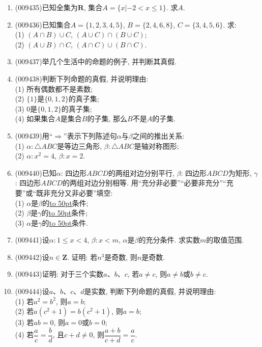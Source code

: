 \documentclass[10pt,a4paper]{article}
\newcommand{\blank}[1]{\underline{\hbox to #1pt{}}}
\begin{document}
\begin{enumerate}[1.]
\item {\tiny (009435)}已知全集为$\mathbf{R}$, 集合$A=\{x|-2<x\le 1\}$. 求$A$.
\item {\tiny (009436)}已知集合$A=\{1, 2, 3, 4, 5\}$, $B=\{2, 4, 6, 8\}$, $C=\{3, 4, 5, 6\}$. 求:\\
(1) $(A\cap B)\cup C$, $(A\cup C)\cap (B\cup C)$;\\
(2) $(A\cup B)\cap C$, $(A\cap C)\cup (B\cap C)$.
\item {\tiny (009437)}举几个生活中的命题的例子, 并判断其真假.
\item {\tiny (009438)}判断下列命题的真假, 并说明理由:\\
(1) 所有偶数都不是素数;\\
(2) $\{1\}$是$\{0, 1, 2\}$的真子集;\\
(3) $0$是$\{0, 1, 2\}$的真子集;\\
(4) 如果集合$A$是集合$B$的子集, 那么$B$不是$A$的子集.
\item {\tiny (009439)}用``$\Rightarrow$''表示下列陈述句$\alpha$与$\beta$之间的推出关系:\\
(1) $\alpha: \triangle ABC$是等边三角形, $\beta: \triangle ABC$是轴对称图形;\\
(2) $\alpha: x^2=4$, $\beta: x=2$.
\item {\tiny (009440)}已知$\alpha$: 四边形$ABCD$的两组对边分别平行, $\beta$: 四边形$ABCD$为矩形, $\gamma$: 四边形$ABCD$的两组对边分别相等. 用``充分非必要''``必要非充分''``充要''或``既非充分又非必要''填空:\\
(1) $\alpha$是$\beta$的\blank{50}条件;\\
(2) $\beta$是$\gamma$的\blank{50}条件;\\
(3) $\alpha$是$\gamma$的\blank{50}条件.
\item {\tiny (009441)}设$\alpha: 1\le x<4$, $\beta: x<m$, $\alpha$是$\beta$的充分条件. 求实数$m$的取值范围.
\item {\tiny (009442)}设$n\in \mathbf{Z}$. 证明: 若$n^3$是奇数, 则$n$是奇数.
\item {\tiny (009443)}证明: 对于三个实数$a$、$b$、$c$, 若$a\ne c$, 则$a\ne b$或$b\ne c$.
\item {\tiny (009444)}设$a$、$b$、$c$、$d$是实数, 判断下列命题的真假, 并说明理由:\\
(1) 若$a^2=b^2$, 则$a=b$;\\
(2) 若$a(c^2+1)=b(c^2+1)$, 则$a=b$;\\
(3) 若$ab=0$, 则$a=0$或$b=0$;\\
(4) 若$\dfrac ac=\dfrac bd$, 且$c+d\ne 0$, 则$\dfrac{a+b}{c+d}=\dfrac ac$.

\end{enumerate}
\end{document}
